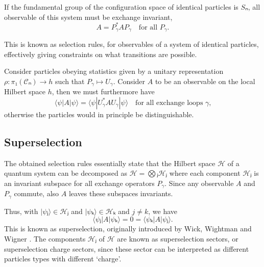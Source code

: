 \begin{lemma}
  If the fundamental group of the configuration space of identical particles is $Sₙ$, all observable of this system must be exchange invariant,
  \begin{equation}
    A = P_γ^*AP_γ\quad\text{for all $P_γ$}.
  \end{equation}
\end{lemma}

This is known as selection rules, for observables of a system of identical particles, effectively giving constraints on what transitions are possible.

Consider particles obeying statistics given by a unitary representation $ρ : π₁(𝒞ₙ) → h$ such that $P_γ ↦ U_γ$. Consider $A$ to be an observable on the local Hilbert space $h$, then we must furthermore have
\begin{equation}
  ⟨ψ|A|ψ⟩ = ⟨ψ|U_γ^*AU_γ|ψ⟩ \quad\text{for all exchange loops $γ$,}
\end{equation}
otherwise the particles would in principle be distinguishable.


\subsection{Superselection}

The obtained selection rules essentially state that the Hilbert space $ℋ$ of a quantum system can be decomposed as $ℋ = ⨂ⱼ ℋⱼ$ where each component $ℋⱼ$ is an invariant subspace for all exchange operators $P_γ$. Since any observable $A$ and $P_γ$ commute, also $A$ leaves these subspaces invariants.

Thus, with $|ψⱼ⟩ ∈ ℋⱼ$ and $|ψₖ⟩ ∈ ℋₖ$ and $j≠k$, we have
\begin{equation}
  ⟨ψⱼ|A|ψₖ⟩ = 0 = ⟨ψₖ|A|ψⱼ⟩.
\end{equation}
%
%
This is known as superselection, originally introduced by Wick, Wightman and Wigner \cite{wick-wightman-wigner}. The components $ℋⱼ$ of $ℋ$ are known as superselection sectors, or superselection charge sectors, since these sector can be interpreted as different particles types with different `charge'.

